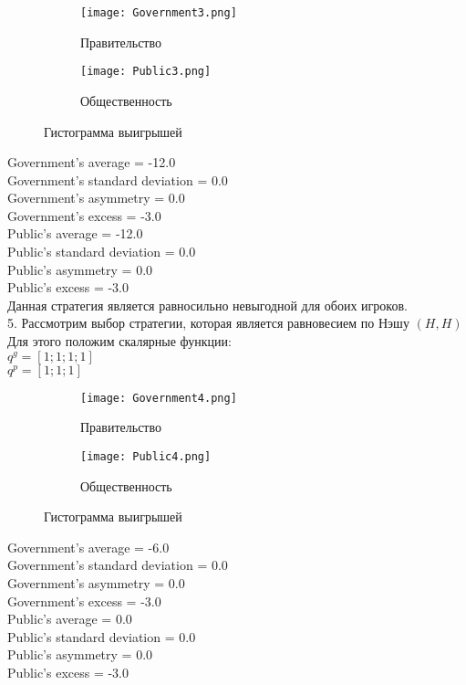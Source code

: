  	\begin{figure}[h]
 		
 		\begin{subfigure}{0.5\textwidth}
 			\texttt{[image: Government3.png]} 
 			\caption{Правительство}
 			\label{fig:government3}
 		\end{subfigure}
 		\begin{subfigure}{0.5\textwidth}
 			\texttt{[image: Public3.png]}
 			\caption{Общественность}
 			\label{fig:public3}
 		\end{subfigure}
 		
 		\caption{Гистограмма выигрышей}
 		\label{fig:stat3}
 	\end{figure}
 Government's average = -12.0\\
 Government's standard deviation = 0.0\\
 Government's asymmetry = 0.0\\
 Government's excess = -3.0\\
 Public's average = -12.0\\
 Public's standard deviation = 0.0\\
 Public's asymmetry = 0.0\\
 Public's excess = -3.0\\
 
 Данная стратегия является равносильно невыгодной для обоих игроков.\\
 
 5. Рассмотрим выбор стратегии, которая является равновесием по Нэшу $(H,H)$\\
 Для этого положим скалярные функции:\\
 $q^g =[ 1; 1; 1; 1 ]$ \\
 $q^p=[ 1; 1; 1] $ \\
 
 	\begin{figure}[h]
 		
 		\begin{subfigure}{0.5\textwidth}
 			\texttt{[image: Government4.png]} 
 			\caption{Правительство}
 			\label{fig:government4}
 		\end{subfigure}
 		\begin{subfigure}{0.5\textwidth}
 			\texttt{[image: Public4.png]}
 			\caption{Общественность}
 			\label{fig:public4}
 		\end{subfigure}
 		
 		\caption{Гистограмма выигрышей}
 		\label{fig:stat4}
 	\end{figure}
 	Government's average = -6.0\\
 	Government's standard deviation = 0.0\\
 	Government's asymmetry = 0.0\\
 	Government's excess = -3.0\\
 	Public's average = 0.0\\
 	Public's standard deviation = 0.0\\
 	Public's asymmetry = 0.0\\
 	Public's excess = -3.0\\
 	
